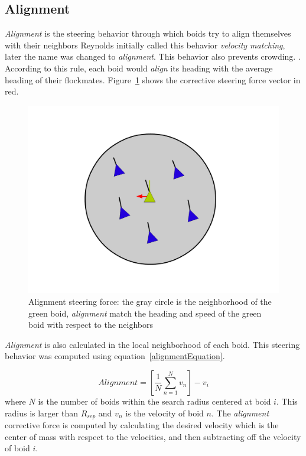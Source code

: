 \subsection{Alignment}
\textit{Alignment} is the steering behavior through which boids try to align themselves with their neighbors  Reynolds initially called this behavior \textit{velocity matching}, later the name was changed to \textit{alignment}. This behavior also prevents crowding. . According to this rule, each boid would \textit{align} its heading with the average heading of their flockmates.  Figure~\ref{alignmentPDF} shows the corrective steering force vector in red.

\begin{figure}[htbp]
\begin{center}
\includegraphics[scale=0.3]{figures/alignment.pdf}
\caption{Alignment steering force: the gray circle is the neighborhood of the green boid, \textit{alignment} match the heading and speed of the green boid with respect to the neighbors}
\label{alignmentPDF}
\end{center}
\end{figure}

\textit{Alignment} is also calculated in the local neighborhood of each boid. This steering behavior was computed using equation~\ref{alignmentEquation}.

\begin{equation}
\label{alignmentEquation}
Alignment = \left[  \frac{1}{N} \sum_{n=1}^{N} v_n \right ] - v_i
\end{equation}
where $N$ is the number of boids within the search radius centered at boid $i$. This radius is larger than $R_{sep}$  and $v_n$ is the velocity of boid $n$. The \textit{alignment} corrective force is computed by calculating the desired velocity which is the center of mass with respect to the velocities, and then subtracting off the velocity of boid $i$.

